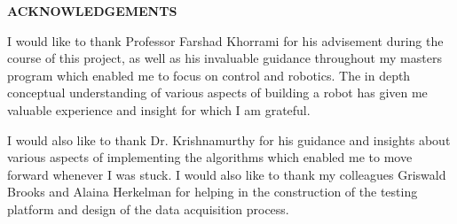 \clearpage
\vspace*{\fill}
	\begin{center}
		\begin{minipage}{\textwidth}
			{\begin{center}{\textbf{ACKNOWLEDGEMENTS}}\end{center}\vspace{10mm}}

				I would like to thank Professor Farshad Khorrami for his advisement during the course of this project, as well as his invaluable guidance throughout my masters program which enabled me to focus on control and robotics. The in depth conceptual understanding of various aspects of building a robot has given me valuable experience and insight for which I am grateful. 
				
				\vspace{5mm}
				\hspace{5mm} 
				I would also like to thank Dr. Krishnamurthy for his guidance and insights about various aspects of implementing the algorithms which enabled me to move forward whenever I was stuck. I would also like to thank my colleagues Griswald Brooks and Alaina Herkelman for helping in the construction of the testing platform and design of the data acquisition process. 

		\end{minipage}
	\end{center}
\vfill %
\clearpage
